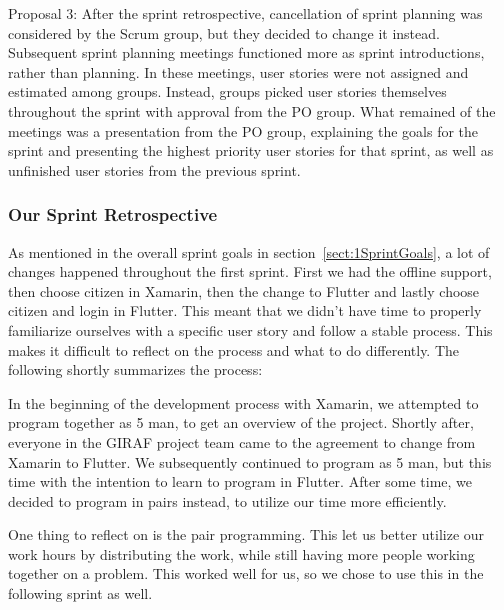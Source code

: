 Proposal 3: After the sprint retrospective, cancellation of sprint planning was considered by the Scrum group, but they decided to change it instead. Subsequent sprint planning meetings functioned more as sprint introductions, rather than planning. In these meetings, user stories were not assigned and estimated among groups. Instead, groups picked user stories themselves throughout the sprint with approval from the PO group. What remained of the meetings was a presentation from the PO group, explaining the goals for the sprint and presenting the highest priority user stories for that sprint, as well as unfinished user stories from the previous sprint.


\subsubsection{Our Sprint Retrospective}
\label{sect:ourRetrospectiveSprint1}
As mentioned in the overall sprint goals in section~\ref{sect:1SprintGoals}, a lot of changes happened throughout the first sprint. First we had the offline support, then choose citizen in Xamarin, then the change to Flutter and lastly choose citizen and login in Flutter. This meant that we didn't have time to properly familiarize ourselves with a specific user story and follow a stable process. This makes it difficult to reflect on the process and what to do differently. The following shortly summarizes the process:

In the beginning of the development process with Xamarin, we attempted to program together as 5 man, to get an overview of the project. Shortly after, everyone in the GIRAF project team came to the agreement to change from Xamarin to Flutter. 
We subsequently continued to program as 5 man, but this time with the intention to learn to program in Flutter. 
After some time, we decided to program in pairs instead, to utilize our time more efficiently.

One thing to reflect on is the pair programming. This let us better utilize our work hours by distributing the work, while still having more people working together on a problem. This worked well for us, so we chose to use this in the following sprint as well.